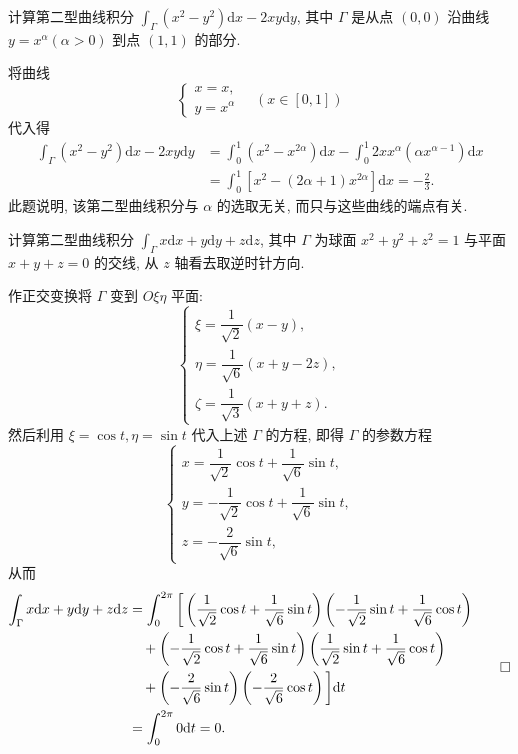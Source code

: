 \begin{example}\label{example:ma-16-2-2}
计算第二型曲线积分 $\int_\Gamma (x^2-y^2)\mathrm dx-2xy\mathrm dy$, 其中 $\Gamma$ 是从点 $(0,0)$ 沿曲线 $y=x^\alpha(\alpha>0)$ 到点 $(1,1)$ 的部分.
\end{example}


\begin{solve}
将曲线
\[
  \begin{cases}
    x=x,\\
    y=x^\alpha
  \end{cases}
  \quad(x\in[0,1])
\]
代入得
\[
\begin{aligned}
  \int_\Gamma (x^2-y^2)\mathrm dx-2xy\mathrm dy
  &=\int_0^1(x^2-x^{2\alpha})\mathrm dx
    -\int_0^1 2xx^\alpha(\alpha x^{\alpha-1})\mathrm dx\\
  &=\int_0^1[x^2-(2\alpha+1)x^{2\alpha}]\mathrm dx
    =-\frac23.
\end{aligned}
\]
此题说明, 该第二型曲线积分与 $\alpha$ 的选取无关, 而只与这些曲线的端点有关.
\end{solve}


\begin{example}\label{example:ma-16-2-3}
计算第二型曲线积分 $\int_\Gamma x\mathrm dx+y\mathrm dy+z\mathrm dz$, 其中 $\Gamma$ 为球面 $x^2+y^2+z^2=1$ 与平面 $x+y+z=0$ 的交线, 从 $z$ 轴看去取逆时针方向.
\end{example}


\begin{solve}[{解法 1}]
作正交变换将 $\Gamma$ 变到 $O\xi\eta$ 平面:
\[
  \begin{cases}
    \xi=\dfrac1{\sqrt2}(x-y),\\
    \eta=\dfrac1{\sqrt6}(x+y-2z),\\
    \zeta=\dfrac1{\sqrt3}(x+y+z).
  \end{cases}
\]
然后利用 $\xi=\cos t,\eta=\sin t$ 代入上述 $\Gamma$ 的方程, 即得 $\Gamma$ 的参数方程
\[
  \begin{cases}
    x=\dfrac1{\sqrt2}\cos t+\dfrac1{\sqrt6}\sin t,\\
    y=-\dfrac1{\sqrt2}\cos t+\dfrac1{\sqrt6}\sin t,\\
    z=-\dfrac2{\sqrt6}\sin t,
  \end{cases}
\]
从而
\[
\begin{aligned}
  \int_\Gamma x\mathrm dx+y\mathrm dy+z\mathrm dz
  &=\int_0^{2\pi}\bigg[
    \left(\frac1{\sqrt2}\cos t+\frac1{\sqrt6}\sin t\right)
    \left(-\frac1{\sqrt2}\sin t+\frac1{\sqrt6}\cos t\right)\\
  &\quad+
    \left(-\frac1{\sqrt2}\cos t+\frac1{\sqrt6}\sin t\right)
    \left(\frac1{\sqrt2}\sin t+\frac1{\sqrt6}\cos t\right)\\
  &\quad+
    \left(-\frac2{\sqrt6}\sin t\right)
    \left(-\frac2{\sqrt6}\cos t\right)
  \bigg]\mathrm dt\\
  &=\int_0^{2\pi}0\mathrm dt=0.
\end{aligned}
\qedhere
\]
\end{solve}



